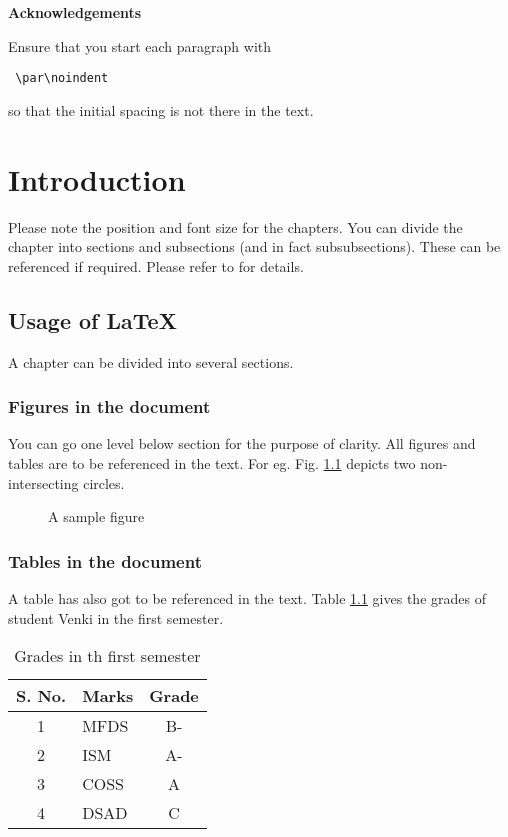 \documentclass{book}
\begin{document}
	\newpage
	\centerline{\bf \Large Acknowledgements}
	\vspace*{0.5cm}
		\par\noindent Ensure that you start each paragraph with \begin{verbatim} \par\noindent \end{verbatim} so that the initial spacing is not there in the text.  %
		\vfill

		\par{}

\tableofcontents
\listoffigures
\listoftables

\chapter{Introduction}
Please note the position and font size for the chapters. You can divide the chapter into sections and subsections (and in fact subsubsections). These can be referenced if required. Please refer to \cite{lamport86latex} for details. 

\section{Usage of \LaTeX}

A chapter can be divided into several sections. 


\subsection{Figures in the document}
You can go one level below section for the purpose of clarity. 
All figures and tables are to be referenced in the text. For eg. Fig. \ref{sample} depicts two non-intersecting circles. 


\begin{figure}[ht]
\epsfxsize=2.5in
\centerline{}
\caption{A sample figure}
\label{sample}
\end{figure}



\subsection{Tables in the document}
A table has also got to be referenced in the text. 
Table \ref{grades} gives the grades of student Venki in the first semester. 
\begin{table}[!h]
	\begin{center}
		\begin{tabular}{|c|l|c|}
			\hline
			S. No. & Marks & Grade \\
			\hline
			1 & MFDS & B- \\
			\hline
			2 & ISM & A- \\
			\hline
			3 & COSS & A \\
			\hline
			4 & DSAD & C \\
			\hline
		\end{tabular}
		\caption{Grades in th first semester}
		\label{grades}
	\end{center}
\end{table}
\end{document}
